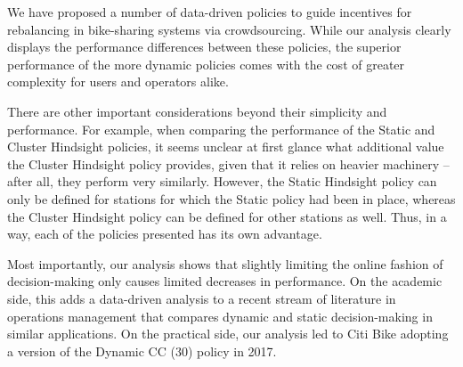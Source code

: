 We have proposed a number of data-driven policies to guide incentives for rebalancing in bike-sharing systems via crowdsourcing. While our analysis clearly displays the performance differences between these policies, the superior performance of the more dynamic policies comes with the cost of greater complexity for users and operators alike. %


There are other important considerations beyond their simplicity and performance. For example, when comparing the performance of the Static and Cluster Hindsight policies, it seems unclear at first glance what additional value the Cluster Hindsight policy provides, given that it relies on heavier machinery -- after all, they perform very similarly. However, the Static Hindsight policy can only be defined for stations for which the Static policy had been in place, whereas the Cluster Hindsight policy can be defined for other stations as well. Thus, in a way, each of the policies presented has its own advantage.

Most importantly, our analysis shows that slightly limiting the online fashion of decision-making only causes limited decreases in performance. On the academic side, this adds a data-driven analysis to a recent stream of literature in operations management that compares dynamic and static decision-making in similar applications. On the practical side, our analysis led to Citi 	Bike adopting a version of the Dynamic CC (30) policy in 2017. 




